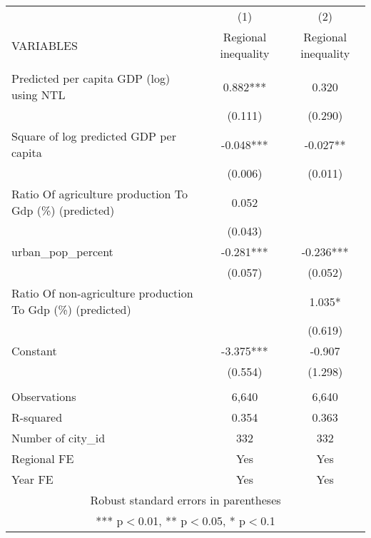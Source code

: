 \documentclass[]{article}
\begin{document}
\begin{tabular}{lcc} \hline
 & (1) & (2) \\
VARIABLES & Regional inequality & Regional inequality \\ \hline
 &  &  \\
Predicted per capita GDP (log) using NTL & 0.882*** & 0.320 \\
 & (0.111) & (0.290) \\
Square of log predicted GDP per capita & -0.048*** & -0.027** \\
 & (0.006) & (0.011) \\
Ratio Of agriculture production To Gdp (\%) (predicted) & 0.052 &  \\
 & (0.043) &  \\
urban\_pop\_percent & -0.281*** & -0.236*** \\
 & (0.057) & (0.052) \\
Ratio Of non-agriculture production To Gdp (\%) (predicted) &  & 1.035* \\
 &  & (0.619) \\
Constant & -3.375*** & -0.907 \\
 & (0.554) & (1.298) \\
 &  &  \\
Observations & 6,640 & 6,640 \\
R-squared & 0.354 & 0.363 \\
Number of city\_id & 332 & 332 \\
Regional FE & Yes & Yes \\
 Year FE & Yes & Yes \\ \hline
\multicolumn{3}{c}{ Robust standard errors in parentheses} \\
\multicolumn{3}{c}{ *** p$<$0.01, ** p$<$0.05, * p$<$0.1} \\
\end{tabular}
\end{document}
